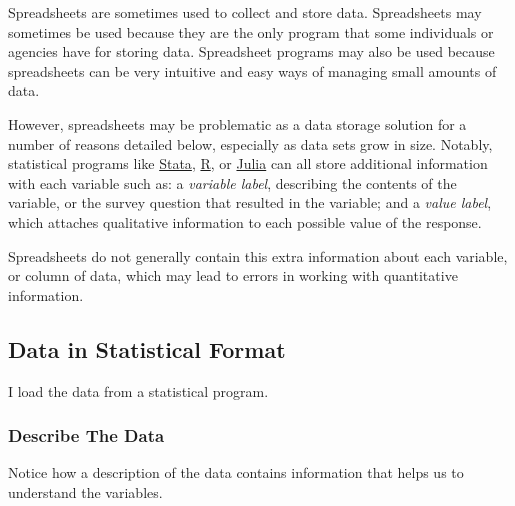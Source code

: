 \documentclass[
  letterpaper,
  DIV=11,
  numbers=noendperiod]{scrreprt}
\begin{document}
Spreadsheets are sometimes used to collect and store data. Spreadsheets
may sometimes be used because they are the only program that some
individuals or agencies have for storing data. Spreadsheet programs may
also be used because spreadsheets can be very intuitive and easy ways of
managing small amounts of data.

However, spreadsheets may be problematic as a data storage solution for
a number of reasons detailed below, especially as data sets grow in
size. Notably, statistical programs like
\href{https://www.stata.com/}{Stata},
\href{https://www.r-project.org/}{R}, or
\href{https://julialang.org/}{Julia} can all store additional
information with each variable such as: a \emph{variable label},
describing the contents of the variable, or the survey question that
resulted in the variable; and a \emph{value label}, which attaches
qualitative information to each possible value of the response.

Spreadsheets do not generally contain this extra information about each
variable, or column of data, which may lead to errors in working with
quantitative information.

\subsection{Data in Statistical
Format}\label{data-in-statistical-format}

I load the data from a statistical program.

\subsubsection{Describe The Data}\label{describe-the-data}

Notice how a description of the data contains information that helps us
to understand the variables.
\end{document}

